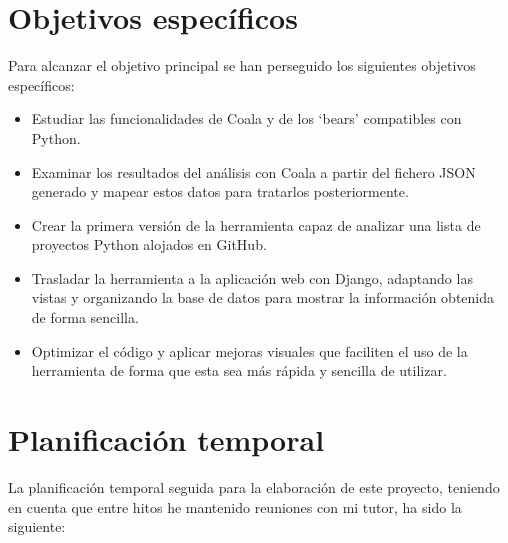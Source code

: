 \documentclass[a4paper, 12pt]{book}
\begin{document}
\section{Objetivos específicos}
\label{sec:objetivos-especificos}
Para alcanzar el objetivo principal se han perseguido los siguientes objetivos específicos:
\begin{itemize}
  \item Estudiar las funcionalidades de Coala y de los `bears' compatibles con Python.
  \item Examinar los resultados del análisis con Coala a partir del fichero JSON generado y mapear estos datos para tratarlos posteriormente.
  \item Crear la primera versión de la herramienta capaz de analizar una lista de proyectos Python alojados en GitHub.
  \item Trasladar la herramienta a la aplicación web con Django, adaptando las vistas y organizando la base de datos para mostrar la información obtenida de forma sencilla.
  \item Optimizar el código y aplicar mejoras visuales que faciliten el uso de la herramienta de forma que esta sea más rápida y sencilla de utilizar.
\end{itemize}


\section{Planificación temporal}
\label{sec:planificacion-temporal}

La planificación temporal seguida para la elaboración de este proyecto, teniendo en cuenta que entre hitos he mantenido reuniones con mi tutor, ha sido la siguiente:
\end{document}
